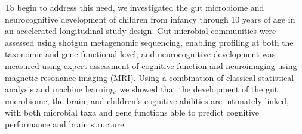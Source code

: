 To begin to address this need, we investigated the gut microbiome and
neurocognitive development of children from infancy through 10 years of
age in an accelerated longitudinal study design. Gut microbial
communities were assessed using shotgun metagenomic sequencing, enabling
profiling at both the taxonomic and gene-functional level, and
neurocognitive development was measured using expert-assessment of
cognitive function and neuroimaging using magnetic resonance imaging
(MRI). Using a combination of classical statistical analysis and machine
learning, we showed that the development of the gut microbiome, the
brain, and children's cognitive abilities are intimately linked, with
both microbial taxa and gene functions able to predict cognitive
performance and brain structure.